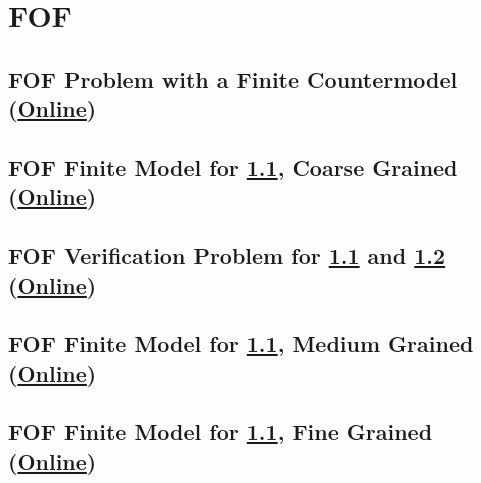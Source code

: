 \documentclass{easychair}
\begin{document}
\newpage
\section{FOF}
\label{FOF}

\subsection{FOF Problem with a Finite Countermodel
(\href{https://raw.githubusercontent.com/GeoffsPapers/InterpretationFormat/master/Examples/FOF_Finite.p}{Online})}
\label{FOF_Finite.p}
\begin{small}

\end{small}

\newpage
\subsection{FOF Finite Model for \ref{FOF_Finite.p}, Coarse Grained
(\href{https://raw.githubusercontent.com/GeoffsPapers/InterpretationFormat/master/Examples/FOF_Finite.s}{Online})}
\label{FOF_Finite.s}
\begin{small}

\end{small}

\newpage
\subsection{FOF Verification Problem for \ref{FOF_Finite.p} and \ref{FOF_Finite.s}
(\href{https://raw.githubusercontent.com/GeoffsPapers/InterpretationFormat/master/Examples/FOF_Finite.s.p}{Online})}
\label{FOF_Finite.s.p}
\begin{small}

\end{small}

\newpage
\subsection{FOF Finite Model for \ref{FOF_Finite.p}, Medium Grained
(\href{https://raw.githubusercontent.com/GeoffsPapers/InterpretationFormat/master/Examples/FOF_Finite_Medium.s}{Online})}
\label{FOF_Finite_Medium.s}
\begin{small}

\end{small}

\newpage
\subsection{FOF Finite Model for \ref{FOF_Finite.p}, Fine Grained
(\href{https://raw.githubusercontent.com/GeoffsPapers/InterpretationFormat/master/Examples/FOF_Finite_Fine.s}{Online})}
\label{FOF_Finite_Fine.s}
\begin{small}

\end{small}
\end{document}
